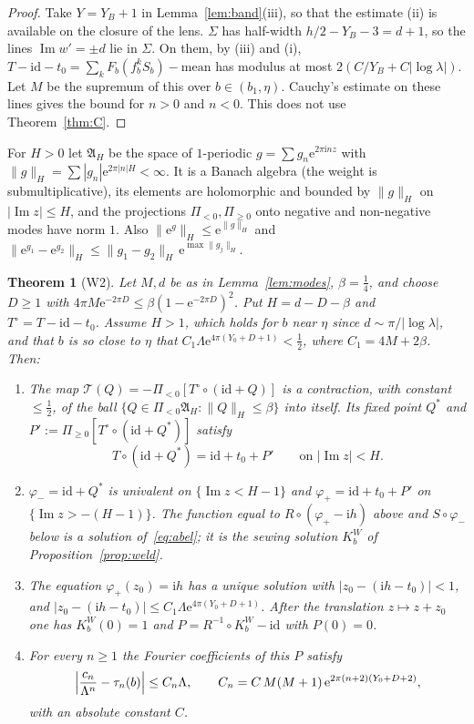 \documentclass[11pt]{amsart}
\newtheorem{theorem}{Theorem}[section]
\theoremstyle{definition}
\newcommand{\Rr}{R}
\newcommand{\Kk}{K}
\newcommand{\eee}{\mathrm{e}}
\newcommand{\ii}{\mathrm{i}}
\begin{document}
\begin{proof}
Take $Y=Y_B+1$ in Lemma~\ref{lem:band}(iii), so that the estimate (ii) is
available on the closure of the lens.  $\Sigma$ has half-width
$h/2-Y_B-3=d+1$, so the lines $\operatorname{Im}w'=\pm d$ lie in $\Sigma$.  On them, by (iii) and (i),
$T-\mathrm{id}-t_0=\sum_kF_b(f_b^kS_b)-\text{mean}$ has modulus at most $2(C/Y_B+C|\log\lambda|)$.  Let $M$ be the supremum of this over
$b\in(b_1,\eta)$.  Cauchy's estimate on these lines gives the bound
for $n>0$ and $n<0$.  This does not use Theorem~\ref{thm:C}.
\end{proof}

For $H>0$ let $\mathfrak A_H$ be the space of $1$-periodic
$g=\sum g_n\eee^{2\pi\ii nz}$ with
$\|g\|_H=\sum|g_n|\eee^{2\pi|n|H}<\infty$.  It is a Banach algebra
(the weight is submultiplicative), its elements are holomorphic and bounded by
$\|g\|_H$ on $|\operatorname{Im}z|\le H$, and the projections
$\Pi_{<0},\Pi_{\ge0}$ onto negative and non-negative modes have norm $1$.  Also
$\|\eee^{g}\|_H\le\eee^{\|g\|_H}$ and
$\|\eee^{g_1}-\eee^{g_2}\|_H\le\|g_1-g_2\|_H\,\eee^{\max\|g_j\|_H}$.

\begin{theorem}[W2]\label{thm:W2}
Let $M,d$ be as in Lemma~\ref{lem:modes}, $\beta=\tfrac14$, and choose $D\ge1$
with $4\pi M\eee^{-2\pi D}\le\beta(1-\eee^{-2\pi D})^2$.  Put $H=d-D-\beta$ and
$T^\circ=T-\mathrm{id}-t_0$.  Assume $H>1$, which holds for $b$ near $\eta$ since
$d\sim\pi/|\log\lambda|$, and that $b$ is so close to $\eta$ that
$C_1\Lambda\eee^{4\pi(Y_0+D+1)}<\tfrac12$, where $C_1=4M+2\beta$.  Then:
\begin{enumerate}
\item The map $\mathcal T(Q)=-\Pi_{<0}[T^\circ\circ(\mathrm{id}+Q)]$ is a
  contraction, with constant $\le\tfrac12$, of the ball
  $\{Q\in\Pi_{<0}\mathfrak A_H:\|Q\|_H\le\beta\}$ into itself.  Its fixed point
  $Q^*$ and $P':=\Pi_{\ge0}[T^\circ\circ(\mathrm{id}+Q^*)]$ satisfy
  \[
   T\circ(\mathrm{id}+Q^*)=\mathrm{id}+t_0+P'\qquad\text{on }|\operatorname{Im}z|<H.
  \]
\item $\varphi_-=\mathrm{id}+Q^*$ is univalent on $\{\operatorname{Im}z<H-1\}$
  and $\varphi_+=\mathrm{id}+t_0+P'$ on $\{\operatorname{Im}z>-(H-1)\}$.  The
  function equal to $\Rr\circ(\varphi_+-\ii h)$ above and $S\circ\varphi_-$ below
  is a solution of~\eqref{eq:abel}; it is the sewing solution $\Kk^W_b$ of
  Proposition~\ref{prop:weld}.
\item The equation $\varphi_+(z_0)=\ii h$ has a unique solution with
  $|z_0-(\ii h-t_0)|<1$, and $|z_0-(\ii h-t_0)|\le C_1\Lambda\eee^{4\pi(Y_0+D+1)}$.
  After the translation $z\mapsto z+z_0$ one has $\Kk^W_b(0)=1$ and
  $P=\Rr^{-1}\circ\Kk^W_b-\mathrm{id}$ with $P(0)=0$.
\item For every $n\ge1$ the Fourier coefficients of this $P$ satisfy
  \[
   \Bigl|\frac{c_n}{\Lambda^n}-\tau_n(b)\Bigr|\le C_n\Lambda,
   \qquad C_n=C\,M(M+1)\,\eee^{2\pi(n+2)(Y_0+D+2)},
  \]
  with an absolute constant $C$.
\end{enumerate}
\end{theorem}
\end{document}
